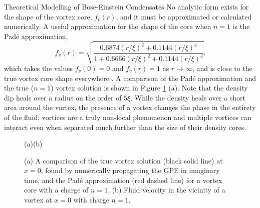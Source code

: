 \begin{chapter}{\label{cha:theoretical_model}Theoretical Modelling of Bose-Einstein Condensates}
No analytic form exists for the shape of the vortex core, $f_v(r)$, and it must be approximated or calculated numerically. A useful approximation for the shape of the core when $n=1$ is the Pad\'e approximation,
	\begin{equation}
		f_v(r) = \sqrt{\frac{0.6874(r/\xi)^2 + 0.1144(r/\xi)^4}{1+0.6666(r/\xi)^2+0.1144(r/\xi)^4}}.
	\end{equation}
which takes the values $f_v(0) = 0$ and $f_v(r) = 1$ as $r\rightarrow\infty$, and is close to the true vortex core shape everywhere \cite{berloff2004}. A comparison of the Pad\'e approximation and the true ($n=1$) vortex solution is shown in Figure \ref{fig_vortex} (a). Note that the density dip heals over a radius on the order of $5\xi$. While the density heals over a short area around the vortex, the presence of a vortex changes the phase in the entirety of the fluid; vortices are a truly non-local phenomenon and multiple vortices can interact even when separated much further than the size of their density cores.

\begin{figure}[!ht]
	\hspace{-0.13\linewidth}(a)\hspace{0.45\linewidth}(b)\hspace{0.03\linewidth}\\
	\centering
  \caption{(a) A comparison of the true vortex solution (black solid line) at $x=0$, found by numerically propagating the GPE in imaginary time, and the Pad\'e approximation (red dashed line) for a vortex core with a charge of $n=1$. (b) Fluid velocity in the vicinity of a vortex at $x=0$ with charge $n=1$.}\label{fig_vortex}
 \end{figure}


\end{chapter}
